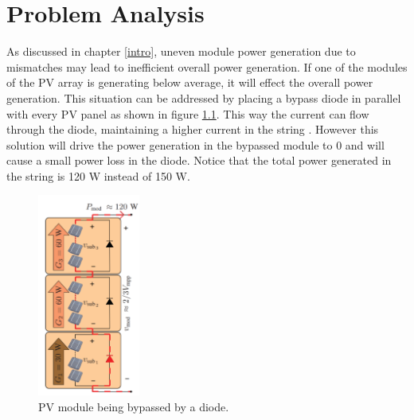 \chapter{Problem Analysis}

As discussed in chapter \ref{intro}, uneven module power generation due to mismatches may lead to inefficient overall power generation. If one of the modules of the PV array is generating below average, it will effect the overall power generation. This situation can be addressed by placing a bypass diode in parallel with every PV panel as shown in figure \ref{BYPASSED_MODULE}. This way the current can flow through the diode, maintaining a higher current in the string \cite{ArchitectureMIC}. However this solution will drive the power generation in the bypassed module to 0 and will cause a small power loss in the diode. Notice that the total power generated in the string is 120 W instead of 150 W.

\begin{figure}[htbp]
	\begin{center}
		\includegraphics[width=0.3\textwidth]{../Pictures/Uneven_generation}
		\caption{PV module being bypassed by a diode\cite{ArchitectureMIC}.  %
		}
		\label{BYPASSED_MODULE}
	\end{center}	
\end{figure}

